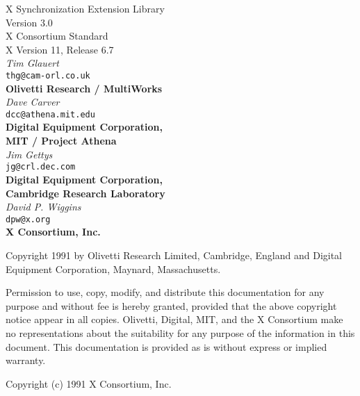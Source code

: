 \begin{center}

{\large X Synchronization Extension Library}\\[10pt]
{\large Version 3.0}\\[15pt]
{\large X Consortium Standard}\\[15pt]
{\large X Version 11, Release 6.7}\\[15pt]
{\it Tim Glauert}\\[0pt]
{\tt thg@cam-orl.co.uk}\\[0pt]
{\bf Olivetti Research / MultiWorks}\\[5pt]
{\it Dave Carver}\\[0pt]
{\tt dcc@athena.mit.edu}\\[0pt]
{\bf Digital Equipment Corporation,}\\[0pt]
{\bf MIT / Project Athena}\\[5pt]
{\it Jim Gettys}\\[0pt]
{\tt jg@crl.dec.com}\\[0pt]
{\bf Digital Equipment Corporation,}\\[0pt]
{\bf Cambridge Research Laboratory}\\[5pt]
{\it David P. Wiggins}\\[0pt]
{\tt dpw@x.org}\\[0pt]
{\bf X Consortium, Inc.}\\[0pt]

\end {center}

Copyright 1991 by Olivetti Research Limited, Cambridge, England and
Digital Equipment Corporation, Maynard, Massachusetts.

{\small Permission to use, copy, modify, and distribute this documentation
for any purpose and without fee is hereby granted, provided that the above
copyright notice appear in all copies. Olivetti, Digital, MIT, and the
X Consortium
make no representations about the suitability for any purpose of the
information in this document. This documentation is provided as is without
express or implied warranty.}

Copyright (c) 1991 X Consortium, Inc.

